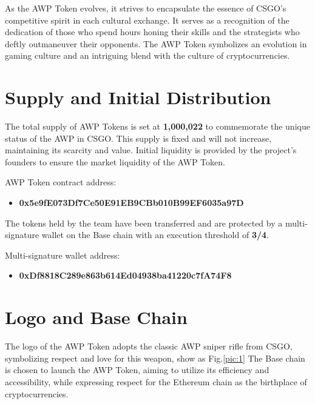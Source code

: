 \documentclass[journal,onecolumn,]{IEEEtran}
\begin{document}
	As the AWP Token evolves, it strives to encapsulate the essence of CSGO's competitive spirit in each cultural exchange. It serves as a recognition of the dedication of those who spend hours honing their skills and the strategists who deftly outmaneuver their opponents. The AWP Token symbolizes an evolution in gaming culture and an intriguing blend with the culture of cryptocurrencies.



	\section{Supply and Initial Distribution}
	The total supply of AWP Tokens is set at \textbf{1,000,022} to commemorate the unique status of the AWP in CSGO. This supply is fixed and will not increase, maintaining its scarcity and value. Initial liquidity is provided by the project's founders to ensure the market liquidity of the AWP Token.
	
		
	AWP Token contract address: 
	
	\begin{itemize}
		\item 	\textbf{0x5e9fE073Df7Ce50E91EB9CBb010B99EF6035a97D}
	\end{itemize}
	
	The tokens held by the team have been transferred and are protected by a multi-signature wallet on the Base chain with an execution threshold of \textbf{3/4}.
	
	 Multi-signature wallet address: 
	 
	 	\begin{itemize}
	 	\item 	\textbf{0xDf8818C289e863b614Ed04938ba41220c7fA74F8}
	 \end{itemize}
	 
	  

	
	 
	
	\section{Logo and Base Chain}
	The logo of the AWP Token adopts the classic AWP sniper rifle from CSGO, symbolizing respect and love for this weapon, show as Fig.\ref{pic:1} The Base chain is chosen to launch the AWP Token, aiming to utilize its efficiency and accessibility, while expressing respect for the Ethereum chain as the birthplace of cryptocurrencies.
	
	
	
\end{document}
